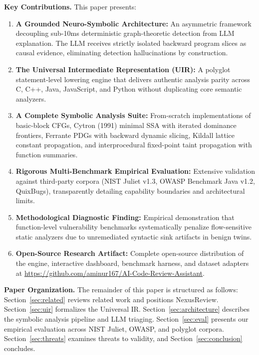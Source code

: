 \documentclass[10pt,conference]{IEEEtran}
\begin{document}
\textbf{Key Contributions.} This paper presents:
\begin{enumerate}
\item \textbf{A Grounded Neuro-Symbolic Architecture:} An asymmetric framework decoupling sub-10ms deterministic graph-theoretic detection from LLM explanation. The LLM receives strictly isolated backward program slices as causal evidence, eliminating detection hallucinations by construction.
\item \textbf{The Universal Intermediate Representation (UIR):} A polyglot statement-level lowering engine that delivers authentic analysis parity across C, C++, Java, JavaScript, and Python without duplicating core semantic analyzers.
\item \textbf{A Complete Symbolic Analysis Suite:} From-scratch implementations of basic-block CFGs, Cytron (1991) minimal SSA with iterated dominance frontiers, Ferrante PDGs with backward dynamic slicing, Kildall lattice constant propagation, and interprocedural fixed-point taint propagation with function summaries.
\item \textbf{Rigorous Multi-Benchmark Empirical Evaluation:} Extensive validation against third-party corpora (NIST Juliet v1.3, OWASP Benchmark Java v1.2, QuixBugs), transparently detailing capability boundaries and architectural limits.
\item \textbf{Methodological Diagnostic Finding:} Empirical demonstration that function-level vulnerability benchmarks systematically penalize flow-sensitive static analyzers due to unremediated syntactic sink artifacts in benign twins.
\item \textbf{Open-Source Research Artifact:} Complete open-source distribution of the engine, interactive dashboard, benchmark harness, and dataset adapters at \url{https://github.com/aminur167/AI-Code-Review-Assistant}.
\end{enumerate}

\textbf{Paper Organization.} The remainder of this paper is structured as follows: Section~\ref{sec:related} reviews related work and positions NexusReview. Section~\ref{sec:uir} formalizes the Universal IR. Section~\ref{sec:architecture} describes the symbolic analysis pipeline and LLM triaging. Section~\ref{sec:eval} presents our empirical evaluation across NIST Juliet, OWASP, and polyglot corpora. Section~\ref{sec:threats} examines threats to validity, and Section~\ref{sec:conclusion} concludes.

\end{document}
